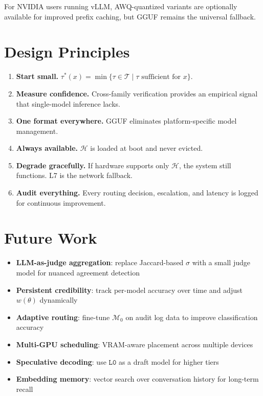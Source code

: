 \documentclass[11pt, a4paper, twocolumn]{article}
\newcommand{\tier}[1]{\texttt{L#1}}
\newcommand{\model}{\mathcal{M}}
\begin{document}
For NVIDIA users running vLLM, AWQ-quantized variants are optionally available for improved prefix caching, but GGUF remains the universal fallback.

\section{Design Principles}

\begin{enumerate}[nosep, leftmargin=*]
    \item \textbf{Start small.} $\tau^*(x) = \min\{\tau \in \mathcal{T} \mid \tau \text{ sufficient for } x\}$.
    \item \textbf{Measure confidence.} Cross-family verification provides an empirical signal that single-model inference lacks.
    \item \textbf{One format everywhere.} GGUF eliminates platform-specific model management.
    \item \textbf{Always available.} $\mathcal{H}$ is loaded at boot and never evicted.
    \item \textbf{Degrade gracefully.} If hardware supports only $\mathcal{H}$, the system still functions. L7 is the network fallback.
    \item \textbf{Audit everything.} Every routing decision, escalation, and latency is logged for continuous improvement.
\end{enumerate}

\section{Future Work}

\begin{itemize}[nosep, leftmargin=*]
    \item \textbf{LLM-as-judge aggregation}: replace Jaccard-based $\sigma$ with a small judge model for nuanced agreement detection
    \item \textbf{Persistent credibility}: track per-model accuracy over time and adjust $w(\theta)$ dynamically
    \item \textbf{Adaptive routing}: fine-tune $\model_0$ on audit log data to improve classification accuracy
    \item \textbf{Multi-GPU scheduling}: VRAM-aware placement across multiple devices
    \item \textbf{Speculative decoding}: use $\tier{0}$ as a draft model for higher tiers
    \item \textbf{Embedding memory}: vector search over conversation history for long-term recall
\end{itemize}
\end{document}
